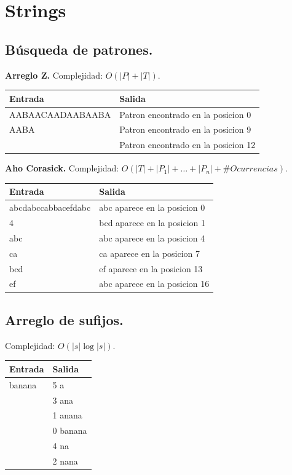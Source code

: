 \documentclass[12pt, letterpaper, twoside]{article}
\begin{document}
\newpage

\section{Strings}

\subsection{Búsqueda de patrones.}

\textbf{Arreglo Z.} Complejidad: $O(|P| + |T|)$.



\begin{tabular}{|p{7cm}|p{7cm}|}
\hline
\textbf{Entrada} & \textbf{Salida}\\ \hline
AABAACAADAABAABA & Patron encontrado en la posicion 0\\
AABA             & Patron encontrado en la posicion 9\\
& Patron encontrado en la posicion 12\\ \hline
\end{tabular}\bigskip

\textbf{Aho Corasick.} Complejidad: $O(|T| + |P_1| + \ldots + |P_n| + \#Ocurrencias)$.



\begin{tabular}{|p{7cm}|p{7cm}|}
\hline
\textbf{Entrada} & \textbf{Salida}\\ \hline
abcdabccabbacefdabc & abc aparece en la posicion 0\\
4                   & bcd aparece en la posicion 1\\
abc                 & abc aparece en la posicion 4\\
ca                  & ca aparece en la posicion 7\\
bcd                 & ef aparece en la posicion 13\\
ef                  & abc aparece en la posicion 16\\ \hline
\end{tabular}\bigskip

\subsection{Arreglo de sufijos.}

Complejidad: $O(|s|\log |s|)$.



\begin{tabular}{|p{7cm}|p{7cm}|}
\hline
\textbf{Entrada} & \textbf{Salida}\\ \hline
banana & 5 a\\
& 3 ana\\
& 1 anana\\
& 0 banana\\
& 4 na\\
& 2 nana\\ \hline
\end{tabular}

\newpage
\end{document}
